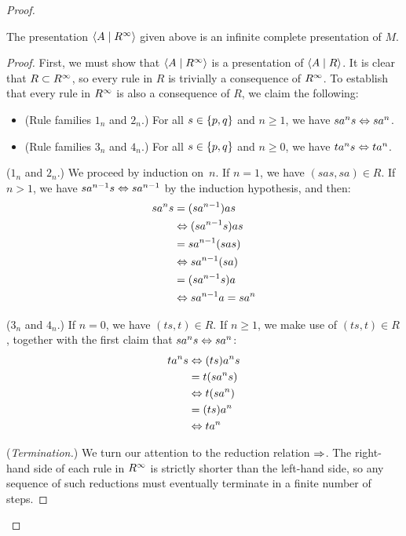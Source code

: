\documentclass[../generics]{subfiles}
\begin{document}
\begin{proof}
\begin{lemma}\label{lemma:rinf complete}
The presentation $\langle A \mid R^\infty\rangle$ given above is an infinite complete presentation of $M$.
\end{lemma}
\begin{proof}
First, we must show that $\langle A \mid R^\infty\rangle$ is a presentation of $\langle A \mid R\rangle$. It is clear that $R \subset R^\infty$, so every rule in $R$ is trivially a consequence of $R^\infty$. To establish that every rule in $R^\infty$ is also a consequence of $R$, we claim the following:
\begin{itemize}
\item (Rule families $1_n$ and $2_n$.) For all $s \in \{p,q\}$ and $n \geq 1$, we have $sa^ns \Leftrightarrow sa^n$.
\item (Rule families $3_n$ and $4_n$.) For all $s \in \{p,q\}$ and $n \geq 0$, we have $ta^ns \Leftrightarrow ta^n$.
\end{itemize}

($1_n$ and $2_n$.) We proceed by induction on~$n$. If $n=1$, we have $(sas,sa) \in R$. If $n>1$, we have $sa^{n-1}s \Leftrightarrow sa^{n-1}$ by the induction hypothesis, and then:
\begin{align*}
sa^ns & = (sa^{n-1})as \\
& \Leftrightarrow (sa^{n-1}s)as \\
& = sa^{n-1}(sas) \\
& \Leftrightarrow sa^{n-1}(sa) \\
& = (sa^{n-1}s)a \\
& \Leftrightarrow sa^{n-1}a = sa^n
\end{align*}

\smallskip

($3_n$ and $4_n$.) If $n=0$, we have $(ts, t) \in R$. If $n \geq 1$, we make use of $(ts, t) \in R$, together with the first claim that $sa^ns \Leftrightarrow sa^n$:
\begin{align*}
ta^ns & \Leftrightarrow (ts)a^ns \\
& = t(sa^ns) \\
& \Leftrightarrow t(sa^n) \\
& = (ts)a^n \\
& \Leftrightarrow ta^n
\end{align*}

(\emph{Termination.})
We turn our attention to the reduction relation $\Rightarrow$. The right-hand side of each rule in $R^\infty$ is strictly shorter than the left-hand side, so any sequence of such reductions must eventually terminate in a finite number of steps.

\smallskip


\end{proof}
\end{proof}
\end{document}
